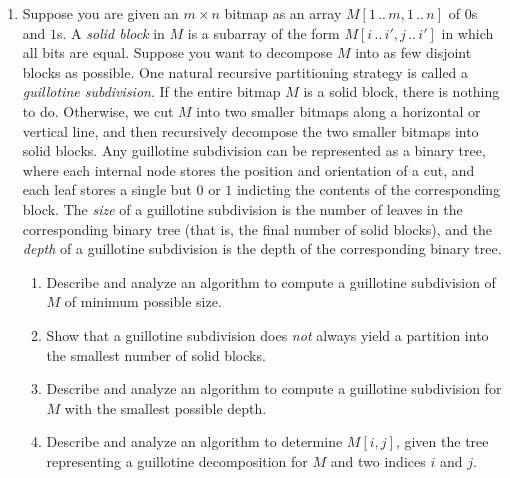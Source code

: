 \begin{enumerate}[label=\arabic*.,ref=\thechapter.\arabic*,leftmargin=*,align=left,widest*=99,itemsep=1.5ex plus 0.5ex,resume]
\begin{enumerate}
An AA tree is a red-black tree with one additional constraint:
\begin{itemize}
\item No left child is red.\footnote{Sedgwick’s reformulation requires that no \textit{right} child is red. Whatever. Andersson and Sedgewick are strangely silent about whether to measure angles clockwise or counterclockwise, whether Pluto is a planet, whether “lower rank” means “better” or “worse”, and whether it’s better to fight a hundred duck-sized horses or a single horse-sized duck.}
\end{itemize}
Describe and analyze an algorithm to construct an optimal AA tree for a given set of search keys and frequencies.
\end{enumerate}
\item Suppose you are given an $m\times n$ bitmap as an array $M[1\,..\,m,1\,..\,n]$ of $0$s and $1$s.
A \textit{solid block} in $M$ is a subarray of the form $M[i\,..\,i',j\,..\,i']$ in which all bits are equal.
Suppose you want to decompose $M$ into as few disjoint blocks as possible.
One natural recursive partitioning strategy is called a \textit{guillotine subdivision}.
If the entire bitmap $M$ is a solid block, there is nothing to do.
Otherwise, we cut $M$ into two smaller bitmaps along a horizontal or vertical line, and then recursively decompose the two smaller bitmaps into solid blocks.
Any guillotine subdivision can be represented as a binary tree, where each internal node stores the position and orientation of a cut, and each leaf stores a single but $0$ or $1$ indicting the contents of the corresponding block.
The \textit{size} of a guillotine subdivision is the number of leaves in the corresponding binary tree (that is, the final number of solid blocks), and the \textit{depth} of a guillotine subdivision is the depth of the corresponding binary tree.
\begin{enumerate}
\item Describe and analyze an algorithm to compute a guillotine subdivision of $M$ of minimum possible size.
\item Show that a guillotine subdivision does \textit{not} always yield a partition into the smallest number of solid blocks.
\item Describe and analyze an algorithm to compute a guillotine subdivision for $M$ with the smallest possible depth.
\item Describe and analyze an algorithm to determine $M[i,j]$, given the tree representing a guillotine decomposition for $M$ and two indices $i$ and $j$.

\end{enumerate}
\end{enumerate}
